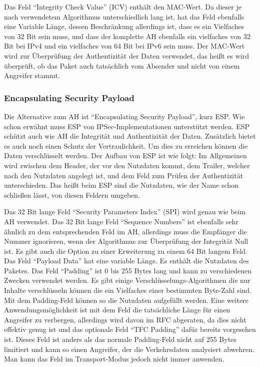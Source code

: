 \documentclass[12pt]{scrartcl}
\begin{document}
Das Feld "`Integrity Check Value"' (ICV) enthält den MAC-Wert. Da dieser je nach verwendetem Algorithmus unterschiedlich lang ist, hat das Feld ebenfalls eine Variable Länge, dessen Beschränkung allerdings ist, dass es ein Vielfaches von 32 Bit sein muss, und dass der komplette AH ebenfalls ein vielfaches von 32 Bit bei IPv4 und ein vielfaches von 64 Bit bei IPv6 sein muss. Der MAC-Wert wird zur Überprüfung der Authentizität der Daten verwendet, das heißt es wird überprüft, ob das Paket auch tatsächlich vom Absender und nicht von einem Angreifer stammt.
\subsubsection{Encapsulating Security Payload}
Die Alternative zum AH ist "`Encapsulating Security Payload"', kurz ESP. Wie schon erwähnt muss ESP von IPSec-Implementationen unterstützt werden. 
ESP schützt auch wie AH die Integrität und Authentizität der Daten. Zusätzlich bietet es auch noch einen Schutz der Vertraulichkeit. Um dies zu erreichen können die Daten verschlüsselt werden. Der Aufbau von ESP ist wie folgt:
Im Allgemeinen wird zwischen dem Header, der vor den Nutzdaten kommt, dem Trailer, welcher nach den Nutzdaten angelegt ist, und dem Feld zum Prüfen der Authentizität unterschieden. Das heißt beim ESP sind die Nutzdaten, wie der Name schon schließen lässt, von diesen Feldern umgeben.

Das 32 Bit lange Feld "`Security Parameters Index"' (SPI) wird genau wie beim AH verwendet. Das 32 Bit lange Feld "`Sequence Numbers"' ist ebenfalls sehr ähnlich zu dem entsprechenden Feld im AH, allerdings muss die Empfänger die Nummer ignorieren, wenn der Algorithmus zur Überprüfung der Integrität Null ist. Es gibt auch die Option zu einer Erweiterung zu einem 64 Bit langem Feld. Das Feld "`Payload Data"' hat eine variable Länge. Es enthält die Nutzdaten des Paketes. Das Feld "`Padding"' ist 0 bis 255 Bytes lang und kann zu verschiedenen Zwecken verwendet werden. Es gibt einige Verschlüsselungs-Algorithmen die nur Inhalte verschlüsseln können die ein Vielfaches einer bestimmten Byte-Zahl sind. Mit dem Padding-Feld können so die Nutzdaten aufgefüllt werden. Eine weitere Anwendungsmöglichkeit ist mit dem Feld die tatsächliche Länge für einen Angreifer zu verbergen, allerdings wird davon im RFC abgeraten, da dies nicht effektiv genug ist und das optionale Feld "`TFC Padding"' dafür bereits vorgesehen ist. Dieses Feld ist anders als das normale Padding-Feld nicht auf 255 Bytes limitiert und kann so einen Angreifer, der die Verkehrsdaten analysiert abwehren. Man kann das Feld im Transport-Modus jedoch nicht immer anwenden. 
\end{document}
